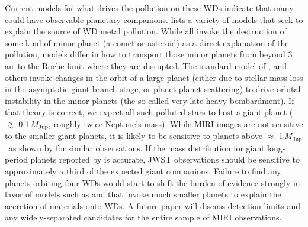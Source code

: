 \documentclass[twocolumn]{aastex631}
\newcommand{\mj}{\,$M_\mathrm{Jup}$}
\newcommand{\au}{\,au}
\begin{document}
Current models for what drives the pollution on these WDs indicate that many could have observable planetary companions.  \citet{Veras21} lists a variety of models that seek to explain the source of WD metal pollution. While all invoke the destruction of some kind of minor planet (a comet or asteroid) as a direct explanation of the pollution, models differ in how to transport those minor planets from beyond 3\au\ to the Roche limit where they are disrupted. The standard model of \citet{Debes2002}, \citet{Frewen14} and others invoke changes in the orbit of a large planet (either due to stellar mass-loss in the asymptotic giant branch stage, or planet-planet scattering) to drive orbital instability in the minor planets (the so-called very late heavy bombardment). If that theory is correct, we expect all such polluted stars to host a giant planet ($\gtrsim$ 0.1\mj, roughly twice Neptune's mass). While MIRI images are not sensitive to the smaller giant planets, it is likely to be sensitive to planets above $\approx$ 1\mj\ as shown by \citet{Poulsen2023} for similar observations. If the mass distribution for giant long-period planets reported by \citet{Fernandes19} is accurate, JWST observations should be sensitive to approximately a third of the expected giant companions. Failure to find any planets orbiting four WDs would start to shift the burden of evidence strongly in favor of models such as \citet{Caiazzo17} and \citet{Veras23} that invoke much smaller planets to explain the accretion of materials onto WDs. A future paper will discuss detection limits and any widely-separated candidates for the entire sample of MIRI observations.

\end{document}
